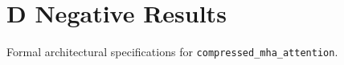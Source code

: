 \section{D Negative Results}

Formal architectural specifications for \texttt{compressed_mha_attention}.
